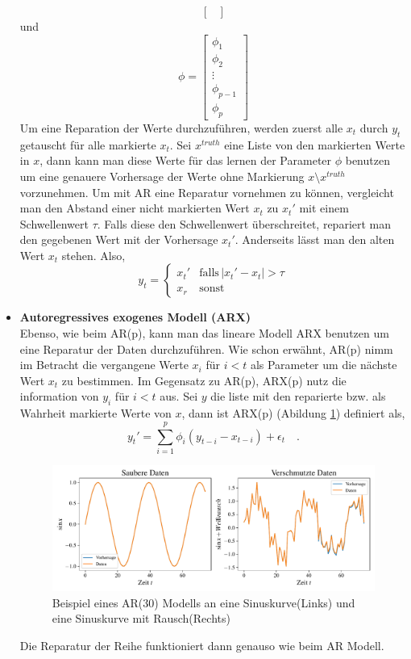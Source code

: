 \begin{itemize}
\[\begin{bmatrix}
    \end{bmatrix}
  \]
  und \[
  \phi=
    \begin{bmatrix}
    \phi_{1}\\
    \phi_{2}\\
    \vdots\\
    \phi_{p-1}\\
    \phi_{p}
    \end{bmatrix}
  \]
  Um eine Reparation der Werte durchzuführen, werden zuerst alle $x_t$ durch
  $y_t$ getauscht für alle markierte $x_t$. Sei $x^{truth}$ eine Liste von den
  markierten Werte in $x$, dann kann man diese Werte für das lernen der
  Parameter $\phi$ benutzen um eine genauere Vorhersage der Werte ohne
  Markierung $x\setminus x^{truth}$ vorzunehmen. Um mit AR eine Reparatur
  vornehmen zu können, vergleicht man den Abstand einer nicht markierten Wert
  $x_t$ zu $x_t'$ mit einem Schwellenwert $\tau$. Falls diese den Schwellenwert
  überschreitet, repariert man den gegebenen Wert mit der Vorhersage $x_t'$.
  Anderseits lässt man den alten Wert $x_t$ stehen. Also,
  \[
    y_t= 
    \begin{cases}
    x_t'& \text{falls} \,|x_t'-x_t|>\tau\\
    x_r              & \text{sonst}
    \end{cases}
  \]
    \item \textbf{Autoregressives exogenes Modell (ARX)}\\
    Ebenso, wie beim AR(p), kann man das lineare Modell ARX benutzen um eine
    Reparatur der Daten durchzuführen. Wie schon erwähnt, AR(p) nimm im
    Betracht die vergangene Werte $x_i$ für $i<t$ als Parameter um die nächste
    Wert $x_t$ zu bestimmen. Im Gegensatz zu AR(p), ARX(p) nutz die information
    von $y_i$ für $i<t$ aus. Sei $y$ die liste mit den reparierte bzw. als
    Wahrheit markierte Werte von $x$, dann ist ARX(p) (Abildung \ref{fig:arx})
    definiert als, 
    \[
      y_t'=\sum_{i=1}^{p}\phi_i(y_{t-i}-x_{t-i})+\epsilon_t\quad.
    \]
    \begin{figure}[h]
      \centering
      \includegraphics[width=\textwidth,keepaspectratio]{../plots/arx_sauber_verschmutze_daten.pdf}
      \caption{Beispiel eines AR(30) Modells an eine Sinuskurve(Links) und eine
      Sinuskurve mit Rausch(Rechts)}
      \label{fig:arx}
    \end{figure}
    Die Reparatur der Reihe funktioniert dann genauso wie beim AR Modell.
\end{itemize}
